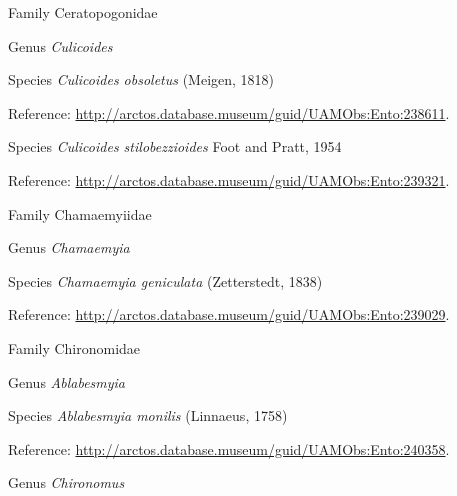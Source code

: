\documentclass[9pt, article]{memoir}
\begin{document}
\begin{multicols}{2}
\vspace{6pt}\noindent\hspace{24pt}Family Ceratopogonidae


\vspace{6pt}\noindent\hspace{30pt}Genus \textit{Culicoides}


\vspace{6pt}\noindent\hspace{36pt}Species \textit{Culicoides obsoletus} (Meigen, 1818)


\vspace{6pt}Reference: 
\url{http://arctos.database.museum/guid/UAMObs:Ento:238611}.

\vspace{6pt}\noindent\hspace{36pt}Species \textit{Culicoides stilobezzioides} Foot and Pratt, 1954


\vspace{6pt}Reference: 
\url{http://arctos.database.museum/guid/UAMObs:Ento:239321}.

\vspace{6pt}\noindent\hspace{24pt}Family Chamaemyiidae


\vspace{6pt}\noindent\hspace{30pt}Genus \textit{Chamaemyia}


\vspace{6pt}\noindent\hspace{36pt}Species \textit{Chamaemyia geniculata} (Zetterstedt, 1838)


\vspace{6pt}Reference: 
\url{http://arctos.database.museum/guid/UAMObs:Ento:239029}.

\vspace{6pt}\noindent\hspace{24pt}Family Chironomidae


\vspace{6pt}\noindent\hspace{30pt}Genus \textit{Ablabesmyia}


\vspace{6pt}\noindent\hspace{36pt}Species \textit{Ablabesmyia monilis} (Linnaeus, 1758)


\vspace{6pt}Reference: 
\url{http://arctos.database.museum/guid/UAMObs:Ento:240358}.

\vspace{6pt}\noindent\hspace{30pt}Genus \textit{Chironomus}



\end{multicols}
\end{document}
